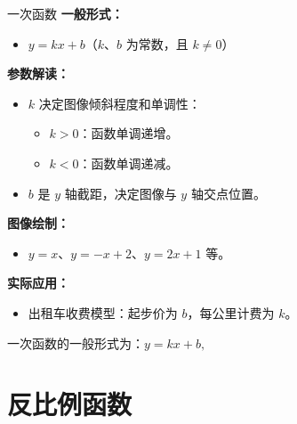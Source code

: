 \documentclass[aspectratio=169]{ctexbeamer} %
\begin{document}
\begin{frame}{一次函数}
    \textbf{一般形式：}
    \begin{itemize}
        \item \( y = kx + b \)（\( k \)、\( b \) 为常数，且 \( k \neq 0 \)）
    \end{itemize}

    \vspace{0.5cm}
    \textbf{参数解读：}
    \begin{itemize}
        \item \( k \) 决定图像倾斜程度和单调性：
        \begin{itemize}
            \item \( k > 0 \)：函数单调递增。
            \item \( k < 0 \)：函数单调递减。
        \end{itemize}
        \item \( b \) 是 \( y \) 轴截距，决定图像与 \( y \) 轴交点位置。
    \end{itemize}

    \vspace{0.5cm}
    \textbf{图像绘制：}
    \begin{itemize}
        \item \( y = x \)、\( y = -x + 2 \)、\( y = 2x + 1 \) 等。
    \end{itemize}

    \vspace{0.5cm}
    \textbf{实际应用：}
    \begin{itemize}
        \item 出租车收费模型：起步价为 \( b \)，每公里计费为 \( k \)。
    \end{itemize}
\end{frame}

\begin{frame}[t]
一次函数的一般形式为：$y = kx + b, $
\end{frame}

\section{反比例函数}
\end{document}
